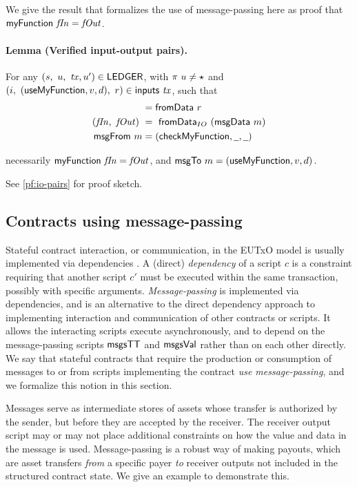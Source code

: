 We give the result that formalizes the use of message-passing here
as proof that $\mathsf{myFunction}~\mathit{fIn} = \mathit{fOut}$.

\paragraph{Lemma (Verified input-output pairs). }
\label{lem:io-pairs}
For any $(s,~u,~\mathit{tx}, u') \in \mathsf{LEDGER}$, with $\pi~u \neq \star$ and
$(i, ~(\mathsf{useMyFunction}, v, d),~ r) \in \mathsf{inputs}~\mathit{tx}$,
such that
\begin{align*}
  [(\receive,~\Msg~m)] &= \fun{fromData}~r \\
  (\var{fIn},~\var{fOut}) ~&=~\fun{fromData}_{IO}~(\fun{msgData}~m) \\
  \fun{msgFrom}~m &= (\mathsf{checkMyFunction}, \wcard, \wcard)
\end{align*}

necessarily $\mathsf{myFunction}~\mathit{fIn} = \mathit{fOut}$, and
$\mathsf{msgTo}~m = (\mathsf{useMyFunction}, v, d)$.

See \ref{pf:io-pairs} for proof sketch.


\subsection{Contracts using message-passing}
\label{sec:async}

Stateful contract interaction, or communication, in the EUTxO model is usually implemented
via dependencies \cite{eutxoma}. A (direct) \emph{dependency} of a script $c$ is a constraint requiring that another
script $c'$ must be executed within the same transaction, possibly with specific
arguments. \emph{Message-passing} is implemented via dependencies, and is an alternative
to the direct dependency approach to implementing interaction and communication
of other contracts or scripts. It allows the interacting scripts execute
asynchronously, and to depend
on the message-passing scripts $\mathsf{msgsTT}$ and $\mathsf{msgsVal}$ rather than
on each other directly. We say that stateful contracts that require the production or
consumption of messages to or from scripts implementing the contract
\emph{use message-passing}, and we formalize this notion in this section.

Messages serve as intermediate stores of assets whose transfer is authorized
by the sender, but before they are accepted by the receiver.
The receiver output script may or may not place additional constraints
on how the value and data in the message is used.
Message-passing is a robust way of
making payouts, which are asset transfers \emph{from} a specific payer \emph{to}
receiver outputs not included in the structured contract
state. We give an example to demonstrate this.

